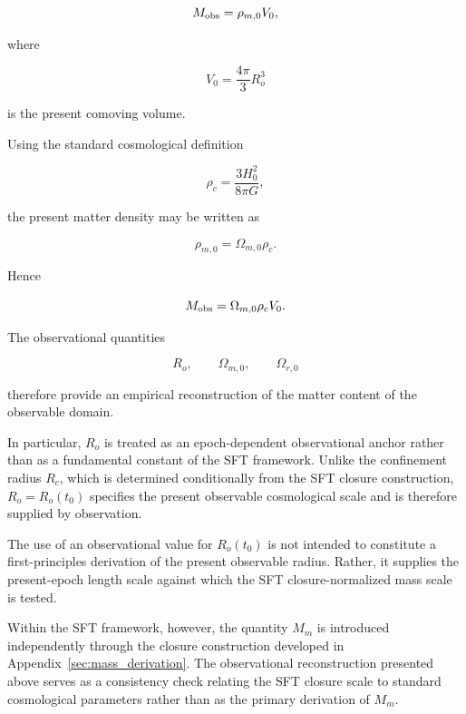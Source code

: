 \documentclass[12pt]{article}
\begin{document}
\begin{equation}
M_{\rm obs}
=
\rho_{m,0}V_0,
\end{equation}

where

\begin{equation}
V_0=\frac{4\pi}{3}R_o^3
\end{equation}

is the present comoving volume.

Using the standard cosmological definition

\begin{equation}
\rho_c
=
\frac{3H_0^2}{8\pi G},
\end{equation}

the present matter density may be written as

\begin{equation}
\rho_{m,0}
=
\Omega_{m,0}\rho_c.
\end{equation}

Hence

\begin{equation}
M_{\rm obs}
=
\Omega_{m,0}\rho_cV_0.
\label{eq:Mm_obs}
\end{equation}

The observational quantities

\begin{equation}
R_o,
\qquad
\Omega_{m,0},
\qquad
\Omega_{r,0}
\end{equation}

therefore provide an empirical reconstruction of the matter content of
the observable domain.

In particular, $R_o$ is treated as an epoch-dependent observational
anchor rather than as a fundamental constant of the SFT framework.
Unlike the confinement radius $R_c$, which is determined conditionally
from the SFT closure construction, $R_o=R_o(t_0)$ specifies the
present observable cosmological scale and is therefore supplied by
observation.

The use of an observational value for $R_o(t_0)$ is not intended to
constitute a first-principles derivation of the present observable
radius. Rather, it supplies the present-epoch length scale against
which the SFT closure-normalized mass scale is tested.

Within the SFT framework, however, the quantity \(M_m\) is introduced
independently through the closure construction developed in
Appendix~\ref{sec:mass_derivation}. The observational reconstruction
presented above serves as a consistency check relating the SFT closure
scale to standard cosmological parameters rather than as the primary
derivation of \(M_m\).
\end{document}
